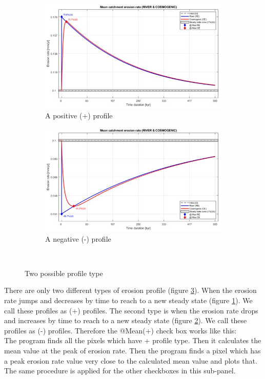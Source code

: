 \documentclass[11pt,a4paper,titlepage]{report}
\begin{document}
\begin{figure}[H]
    \centering
    \begin{subfigure}[H]{0.45\textwidth}
        \includegraphics[width=\textwidth]{+profileRC.jpg}
        \caption{A positive (+) profile}
        \label{fig:profiletype_pos}
    \end{subfigure}
    \quad
    \begin{subfigure}[H]{0.45\textwidth}
        \includegraphics[width=\textwidth]{-profileRC.jpg}
        \caption{A negative (-) profile}
        \label{fig:profiletype_neg}
    \end{subfigure}\\
    \caption[Two possible profile type]{Two possible profile type}
    \label{fig:profiletype}    
\end{figure}

There are only two different types of erosion profile (figure \ref{fig:profiletype}). When the erosion rate jumps and decreases by time to reach to a new steady state (figure \ref{fig:profiletype_pos}). We call these profiles as (+) profiles. The second type is when the erosion rate drops and increases by time to reach to a new steady state (figure \ref{fig:profiletype_neg}). We call these profiles as (-) profiles. Therefore the @Mean(+) check box works like this:\\
The program finds all the pixels which have + profile type. Then it calculates the mean value at the peak of erosion rate. Then the program finds a pixel which has a peak erosion rate value very close to the calculated mean value and plots that. The same procedure is applied for the other checkboxes in this sub-panel.
\end{document}
